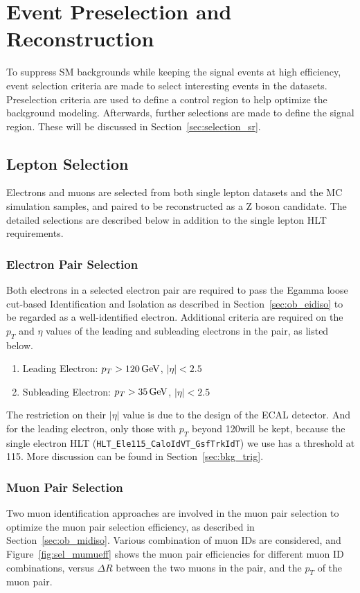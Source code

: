 \section{Event Preselection and Reconstruction}
To suppress SM backgrounds while keeping the signal events at high efficiency, event selection criteria are made to select interesting events in the datasets. Preselection criteria are used to define a control region to help optimize the background modeling. Afterwards, further selections are made to define the signal region. These will be discussed in Section~\ref{sec:selection_sr}.

\subsection{Lepton Selection}
Electrons and muons are selected from both single lepton datasets and the MC simulation samples, and paired to be reconstructed as a Z boson candidate. The detailed selections are described below in addition to the single lepton HLT requirements.
\subsubsection{Electron Pair Selection}
Both electrons in a selected electron pair are required to pass the Egamma loose cut-based Identification and Isolation as described in Section~\ref{sec:ob_eidiso} to be regarded as a well-identified electron. Additional criteria are required on the $p_T$ and $\eta$ values of the leading and subleading electrons in the pair, as listed below.
\begin{enumerate}
\item Leading Electron: $p_T >120\,\text{Ge\hspace{-.08em}V}$, $|\eta|<2.5$
\item Subleading Electron: $p_T >35\,\text{Ge\hspace{-.08em}V}$, $|\eta|<2.5$
\end{enumerate}

The restriction on their $|\eta|$ value is due to the design of the ECAL detector. And for the leading electron, only those with $p_T$ beyond 120\GeV will be kept, because the single electron HLT (\texttt{HLT\_Ele115\_CaloIdVT\_GsfTrkIdT}) we use has a threshold at 115\GeV. More discussion can be found in Section~\ref{sec:bkg_trig}.

\subsubsection{Muon Pair Selection}\label{sec:muonselection}
Two muon identification approaches are involved in the muon pair selection to optimize the muon pair selection efficiency, as described in Section~\ref{sec:ob_midiso}. Various combination of muon IDs are considered, and Figure~\ref{fig:sel_mumueff} shows the muon pair efficiencies for different muon ID combinations, versus $\Delta R$ between the two muons in the pair, and the $p_T$ of the muon pair.

